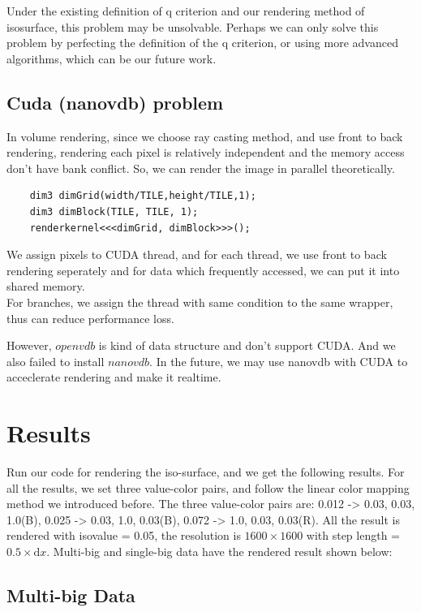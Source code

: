 \documentclass[acmtog]{acmart}
\begin{document}
Under the existing definition of q criterion and our rendering method of isosurface, this problem may be unsolvable. Perhaps we can only solve this problem by perfecting the definition of the q criterion, or using more advanced algorithms, which can be our future work.


\subsection{Cuda (nanovdb) problem}
In volume rendering, since we choose ray casting method, and use front to back rendering, rendering each 
pixel is relatively independent and the memory access don't have bank conflict. So, we can 
render the image in parallel theoretically.\\
\begin{lstlisting}
	dim3 dimGrid(width/TILE,height/TILE,1);
	dim3 dimBlock(TILE, TILE, 1);
	renderkernel<<<dimGrid, dimBlock>>>();
\end{lstlisting}
We assign pixels to CUDA thread, and for each thread, we use front to back rendering seperately 
and for data which frequently accessed, we can put it into shared memory.\\
For branches, we assign the thread with same condition to the same wrapper, 
thus can reduce performance loss.


However, $openvdb$ is kind of data structure and don't support CUDA. And we also failed to 
install $nanovdb$. In the future, we may use nanovdb with CUDA to acceclerate rendering and make it realtime.


\section{Results}


Run our code for rendering the iso-surface, and we get the following results. For all the results, we set three value-color pairs, and follow the linear color mapping method we introduced before. The three value-color pairs are: 0.012 -> {0.03, 0.03, 1.0}(B), 0.025 -> {0.03, 1.0, 0.03}(B), 0.072 -> {1.0, 0.03, 0.03}(R). All the result is rendered with isovalue = 0.05, the resolution is $1600 \times 1600$ with step length = $0.5 \times \mathrm{d}x$. Multi-big and single-big data have the rendered result shown below:


\subsection{Multi-big Data}
\end{document}
